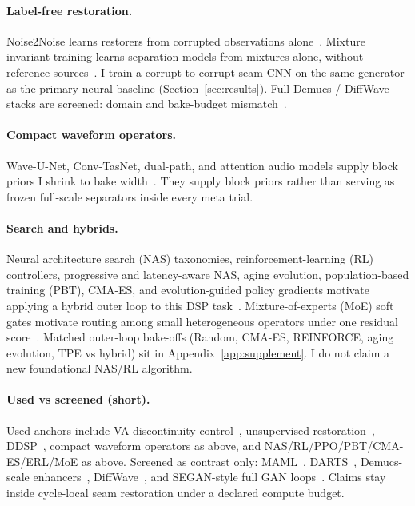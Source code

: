 \paragraph{Label-free restoration.}
Noise2Noise learns restorers from corrupted observations alone~\citep{lehtinen2018,kashyap2021n2n}.
Mixture invariant training learns separation models from mixtures alone, without reference sources~\citep{wisdom2020}.
I train a corrupt-to-corrupt seam CNN on the same generator as the primary neural baseline (Section~\ref{sec:results}).
Full Demucs / DiffWave stacks are screened: domain and bake-budget mismatch~\citep{dfossez2019,kong2021}.

\paragraph{Compact waveform operators.}
Wave-U-Net, Conv-TasNet, dual-path, and attention audio models supply block priors I shrink to bake width~\citep{stoller2018,macartney2018,jansson2017,luo2019,luo2020dprnn,subakan2021,gong2021ast,ronneberger2015,he2016resnet,vaswani2017}.
They supply block priors rather than serving as frozen full-scale separators inside every meta trial.

\paragraph{Search and hybrids.}
Neural architecture search (NAS) taxonomies, reinforcement-learning (RL) controllers, progressive and latency-aware NAS, aging evolution, population-based training (PBT), CMA-ES, and evolution-guided policy gradients motivate applying a hybrid outer loop to this DSP task~\citep{elsken2019,zoph2017nas,pham2018,liu2018pnas,tan2019mnasnet,real2019,jaderberg2017,hansen2016cmaes,khadka2018,schulman2017}.
Mixture-of-experts (MoE) soft gates motivate routing among small heterogeneous operators under one residual score~\citep{shazeer2017}.
Matched outer-loop bake-offs (Random, CMA-ES, REINFORCE, aging evolution, TPE vs hybrid) sit in Appendix~\ref{app:supplement}.
I do not claim a new foundational NAS/RL algorithm.

\paragraph{Used vs screened (short).}
Used anchors include VA discontinuity control~\citep{stilson1996,esqueda2016blamp,valimaki2007polyblep}, unsupervised restoration~\citep{lehtinen2018,kashyap2021n2n,wisdom2020}, DDSP~\citep{engel2020}, compact waveform operators as above, and NAS/RL/PPO/PBT/CMA-ES/ERL/MoE as above.
Screened as contrast only: MAML~\citep{finn2017}, DARTS~\citep{liu2019}, Demucs-scale enhancers~\citep{dfossez2019,dfossez2020,dfossez2021}, DiffWave~\citep{kong2021}, and SEGAN-style full GAN loops~\citep{pascual2017}.
Claims stay inside cycle-local seam restoration under a declared compute budget.
